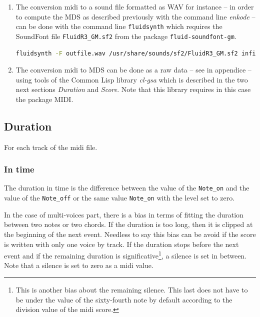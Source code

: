 \begin{enumerate}
\item The conversion midi to a sound file formatted as WAV for instance -- in order to compute the MDS as described previously with the command line \textsl{enkode} -- can be done with the command line \texttt{fluidsynth} which requires the SoundFont file \texttt{FluidR3\_GM.sf2} from the package \texttt{fluid-soundfont-gm}.
\begin{lstlisting}[language=bash]
fluidsynth -F outfile.wav /usr/share/sounds/sf2/FluidR3_GM.sf2 infile.mid
\end{lstlisting}
\item The conversion midi to MDS can be done as a raw data -- see \textsl{} in appendice  -- using tools of the Common Lisp library \textsl{cl-gsa} which is described in the two next sections \textsl{Duration} and \textsl{Score}. Note that this library requires in this case the package MIDI. 

\end{enumerate}

\subsection{Duration}

For each track of the midi file.

\subsubsection{In time}

The duration in time is the difference between the value of the \texttt{Note\_on} and the value of the \texttt{Note\_off} or the same value \texttt{Note\_on} with the level set to zero.

In the case of multi-voices part, there is a bias in terms of fitting the duration between two notes or two chords. If the duration is too long, then it is clipped at the beginning of the next event. Needless to say this bias can be avoid if the score is written with only one voice by track. If the duration stops before the next event and if the remaining duration is significative\footnote{This is another bias about the remaining silence. This last does not have to be under the value of the sixty-fourth note
by default according to the division value of the midi score.}, a silence is set in between. Note that a silence is set to zero as a midi value.

